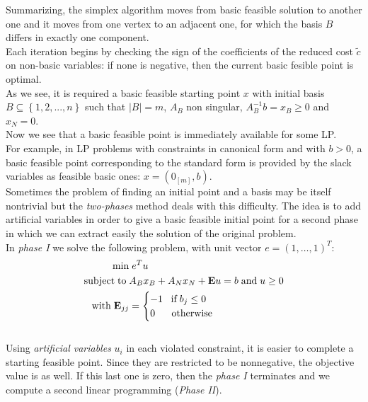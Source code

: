 \documentclass[a4paper,10 pt,titlepage,twoside]{report}
\theoremstyle{plain}
\theoremstyle{definition}
\theoremstyle{remark}
\begin{document}
Summarizing, the simplex algorithm moves from basic feasible solution to another one and it moves from one vertex to an adjacent one, for which the basis $B$ differs in exactly one component.\\ Each iteration begins by checking the sign of the coefficients of the reduced cost $\widetilde{c}$ on non-basic variables: if none is negative, then the current basic fesible point is optimal. \\
As we see, it is required a basic feasible starting point $x$ with initial basis $B \subseteq \left\{ 1,2,..., n \right\}$ such that $|B|=m$, $A_{B}$ non singular, $A_{B}^{-1}b=x_{B} \geq 0$ and $x_{N}=0$.\\[1cm]
Now we see that a basic feasible point is immediately available for some LP.\\ For example, in LP problems with constraints in canonical form and with $b > 0$, a basic feasible point corresponding to the standard form is provided by the slack variables as feasible basic ones: $x =\left(0_{[m]},b\right)$.\\Sometimes the problem of finding an initial point and a basis may be itself nontrivial but the \textit{two-phases} method deals with this difficulty. The idea is to add artificial variables in order to give a basic feasible initial point for a second phase in which we can extract easily the solution of the original problem.\\
In \textit{phase I} we solve the following problem, with unit vector $e= (1,\dots,1)^{T}$:
\begin{equation}\label{IIPH}
\begin{split}
\min &\;e^{T}u\\
\text{subject\;to\;}&A_{B}x_{B}+A_{N}x_{N} + \textbf{E}u = b\;\text{and\;} u\geq 0\\
\text{with\;} \textbf{E}_{jj}& =\begin{cases} -1\;\text{\;\;if\;} b_{j} \leq 0\\
0\;\; \text{\;\;\;\;otherwise}
\end{cases}   
\end{split}
\end{equation} \\
Using \textit{artificial variables} $u_{i}$ in each violated constraint, it is easier to complete a starting feasible point. Since they are restricted to be nonnegative, the objective value is as well. If this last one is zero, then the \textit{phase I} terminates and we compute a second linear programming (\textit{Phase II}).\\
\end{document}
